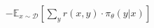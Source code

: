 \documentclass[preview]{standalone}
\begin{document}
\begin{align*}
-\mathbb{E}_{x \sim \mathcal{D}}\left[\sum_{y} r(x, y)\cdot\pi_{\theta}(y|x)\right]
\end{align*}
\end{document}
